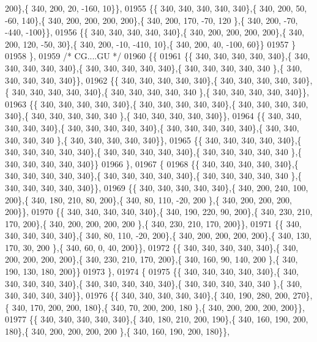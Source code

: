 \begin{DoxyCode}
      200\},\{ 340, 200,  20, -160,  10\}\},
01955 \{\{ 340, 340, 340, 340, 340\},\{ 340, 200,  50, -60, 140\},\{ 340, 200, 200, 200, 200\},\{ 340, 200, 170, -70, 120
      \},\{ 340, 200, -70, -440, -100\}\},
01956 \{\{ 340, 340, 340, 340, 340\},\{ 340, 200, 200, 200, 200\},\{ 340, 200, 120, -50,  30\},\{ 340, 200, -10, -410,  
      10\},\{ 340, 200,  40, -100,  60\}\}
01957 \}
01958 \},
01959 \textcolor{comment}{/* CG....GU */}
01960 \{\{
01961 \{\{ 340, 340, 340, 340, 340\},\{ 340, 340, 340, 340, 340\},\{ 340, 340, 340, 340, 340\},\{ 340, 340, 340, 340, 340
      \},\{ 340, 340, 340, 340, 340\}\},
01962 \{\{ 340, 340, 340, 340, 340\},\{ 340, 340, 340, 340, 340\},\{ 340, 340, 340, 340, 340\},\{ 340, 340, 340, 340, 340
      \},\{ 340, 340, 340, 340, 340\}\},
01963 \{\{ 340, 340, 340, 340, 340\},\{ 340, 340, 340, 340, 340\},\{ 340, 340, 340, 340, 340\},\{ 340, 340, 340, 340, 340
      \},\{ 340, 340, 340, 340, 340\}\},
01964 \{\{ 340, 340, 340, 340, 340\},\{ 340, 340, 340, 340, 340\},\{ 340, 340, 340, 340, 340\},\{ 340, 340, 340, 340, 340
      \},\{ 340, 340, 340, 340, 340\}\},
01965 \{\{ 340, 340, 340, 340, 340\},\{ 340, 340, 340, 340, 340\},\{ 340, 340, 340, 340, 340\},\{ 340, 340, 340, 340, 340
      \},\{ 340, 340, 340, 340, 340\}\}
01966 \},
01967 \{
01968 \{\{ 340, 340, 340, 340, 340\},\{ 340, 340, 340, 340, 340\},\{ 340, 340, 340, 340, 340\},\{ 340, 340, 340, 340, 340
      \},\{ 340, 340, 340, 340, 340\}\},
01969 \{\{ 340, 340, 340, 340, 340\},\{ 340, 200, 240, 100, 200\},\{ 340, 180, 210,  80, 200\},\{ 340,  80, 110, -20, 200
      \},\{ 340, 200, 200, 200, 200\}\},
01970 \{\{ 340, 340, 340, 340, 340\},\{ 340, 190, 220,  90, 200\},\{ 340, 230, 210, 170, 200\},\{ 340, 200, 200, 200, 200
      \},\{ 340, 230, 210, 170, 200\}\},
01971 \{\{ 340, 340, 340, 340, 340\},\{ 340,  80, 110, -20, 200\},\{ 340, 200, 200, 200, 200\},\{ 340, 130, 170,  30, 200
      \},\{ 340,  60,   0,  40, 200\}\},
01972 \{\{ 340, 340, 340, 340, 340\},\{ 340, 200, 200, 200, 200\},\{ 340, 230, 210, 170, 200\},\{ 340, 160,  90, 140, 200
      \},\{ 340, 190, 130, 180, 200\}\}
01973 \},
01974 \{
01975 \{\{ 340, 340, 340, 340, 340\},\{ 340, 340, 340, 340, 340\},\{ 340, 340, 340, 340, 340\},\{ 340, 340, 340, 340, 340
      \},\{ 340, 340, 340, 340, 340\}\},
01976 \{\{ 340, 340, 340, 340, 340\},\{ 340, 190, 280, 200, 270\},\{ 340, 170, 200, 200, 180\},\{ 340,  70, 200, 200, 180
      \},\{ 340, 200, 200, 200, 200\}\},
01977 \{\{ 340, 340, 340, 340, 340\},\{ 340, 180, 210, 200, 190\},\{ 340, 160, 190, 200, 180\},\{ 340, 200, 200, 200, 200
      \},\{ 340, 160, 190, 200, 180\}\},

\end{DoxyCode}
